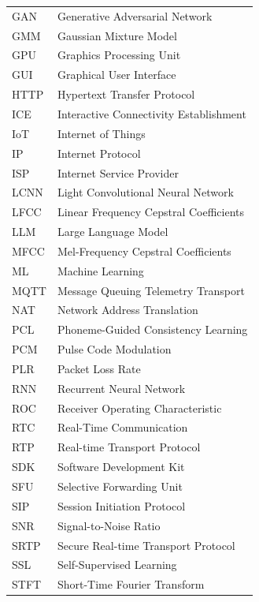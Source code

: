 \begin{longtable}{@{}p{5cm} p{11cm}}
GAN       & Generative Adversarial Network \\[0.2cm]
GMM       & Gaussian Mixture Model \\[0.2cm]
GPU       & Graphics Processing Unit \\[0.2cm]
GUI       & Graphical User Interface \\[0.2cm]
HTTP      & Hypertext Transfer Protocol \\[0.2cm]
ICE       & Interactive Connectivity Establishment \\[0.2cm]
IoT       & Internet of Things \\[0.2cm]
IP        & Internet Protocol \\[0.2cm]
ISP       & Internet Service Provider \\[0.2cm]
LCNN      & Light Convolutional Neural Network \\[0.2cm]
LFCC      & Linear Frequency Cepstral Coefficients \\[0.2cm]
LLM       & Large Language Model \\[0.2cm]
MFCC      & Mel-Frequency Cepstral Coefficients \\[0.2cm]
ML        & Machine Learning \\[0.2cm]
MQTT      & Message Queuing Telemetry Transport \\[0.2cm]
NAT       & Network Address Translation \\[0.2cm]
PCL       & Phoneme-Guided Consistency Learning \\[0.2cm]
PCM       & Pulse Code Modulation \\[0.2cm]
PLR       & Packet Loss Rate \\[0.2cm]
RNN       & Recurrent Neural Network \\[0.2cm]
ROC       & Receiver Operating Characteristic \\[0.2cm]
RTC       & Real-Time Communication \\[0.2cm]
RTP       & Real-time Transport Protocol \\[0.2cm]
SDK       & Software Development Kit \\[0.2cm]
SFU       & Selective Forwarding Unit \\[0.2cm]
SIP       & Session Initiation Protocol \\[0.2cm]
SNR       & Signal-to-Noise Ratio \\[0.2cm]
SRTP      & Secure Real-time Transport Protocol \\[0.2cm]
SSL       & Self-Supervised Learning \\[0.2cm]
STFT      & Short-Time Fourier Transform \\[0.2cm]

\end{longtable}
